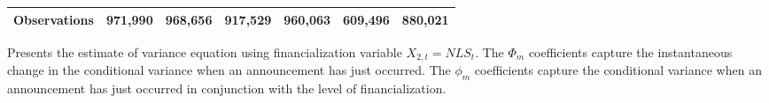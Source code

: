 \begin{landscape}
\begin{table}[]
{\begin{tabular}{lllllllllllll}
Observations &
  \multicolumn{2}{c}{971,990} &
  \multicolumn{2}{c}{968,656} &
  \multicolumn{2}{c}{917,529} &
  \multicolumn{2}{c}{960,063} &
  \multicolumn{2}{c}{609,496} &
  \multicolumn{2}{c}{880,021} \\ \hline
\end{tabular}%
}
 \singlespacing
        \footnotesize
    Presents the estimate of variance equation using financialization variable $X_{2,t}=NLS_t$. The $\Phi_m$ coefficients capture the instantaneous change in the conditional variance when an announcement has just occurred. The $\phi_m$ coefficients capture the conditional variance when an announcement has just occurred in conjunction with the level of financialization.
\end{table}
\end{landscape}


